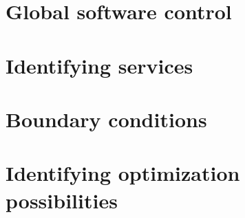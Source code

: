 \section{Global software control}

\section{Identifying services}

\section{Boundary conditions}

\section{Identifying optimization possibilities}